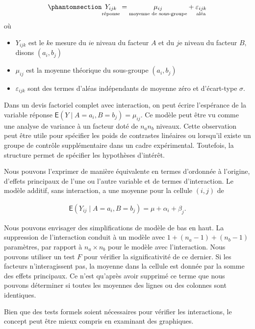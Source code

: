 \documentclass[
  11pt,
  letterpaper,
]{scrbook}
\providecommand{\tightlist}{%
  \setlength{\itemsep}{0pt}\setlength{\parskip}{0pt}}\usepackage{longtable,booktabs,array}
\theoremstyle{plain}
\theoremstyle{plain}
\theoremstyle{definition}
\theoremstyle{definition}
\theoremstyle{remark}
\begin{document}
\begin{equation}\phantomsection\label{eq-twowayasoneway}{
\underset{\text{réponse}\vphantom{b}}{Y_{ijk}} = \underset{\text{moyenne de sous-groupe}}{\mu_{ij}} + \underset{\text{aléa}}{\varepsilon_{ijk}}
}\end{equation} où

\begin{itemize}
\tightlist
\item
  \(Y_{ijk}\) est le \(k\)e mesure du \(i\)e niveau du facteur \(A\) et
  du \(j\)e niveau du facteur \(B,\) disons \((a_i, b_j)\)
\item
  \(\mu_{ij}\) est la moyenne théorique du sous-groupe \((a_i, b_j)\)
\item
  \(\varepsilon_{ijk}\) sont des termes d'aléas indépendants de moyenne
  zéro et d'écart-type \(\sigma.\)
\end{itemize}

Dans un devis factoriel complet avec interaction, on peut écrire
l'espérance de la variable réponse
\(\mathsf{E}(Y \mid A=a_i, B=b_j) = \mu_{ij}.\) Ce modèle peut être vu
comme une analyse de variance à un facteur doté de \(n_an_b\) niveaux.
Cette observation peut être utile pour spécifier les poids de contrastes
linéaires ou lorsqu'il existe un groupe de contrôle supplémentaire dans
un cadre expérimental. Toutefois, la structure permet de spécifier les
hypothèses d'intérêt.

Nous pouvons l'exprimer de manière équivalente en termes d'ordonnée à
l'origine, d'effets principaux de l'une ou l'autre variable et de termes
d'interaction. Le modèle additif, sans interaction, a une moyenne pour
la cellule \((i,j)\) de

\begin{align*}
\mathsf{E}(Y_{ij} \mid A = a_i, B=b_j) = \mu + \alpha_i + \beta_j.
\end{align*}

Nous pouvons envisager des simplifications de modèle de bas en haut. La
suppression de l'interaction conduit à un modèle avec
\(1 + (n_a-1) + (n_b-1)\) paramètres, par rapport à \(n_a \times n_b\)
pour le modèle avec l'interaction. Nous pouvons utiliser un test \(F\)
pour vérifier la significativité de ce dernier. Si les facteurs
n'interagissent pas, la moyenne dans la cellule est donnée par la somme
des effets principaux. Ce n'est qu'après avoir supprimé ce terme que
nous pouvons déterminer si toutes les moyennes des lignes ou des
colonnes sont identiques.

Bien que des tests formels soient nécessaires pour vérifier les
interactions, le concept peut être mieux compris en examinant des
graphiques.
\end{document}
